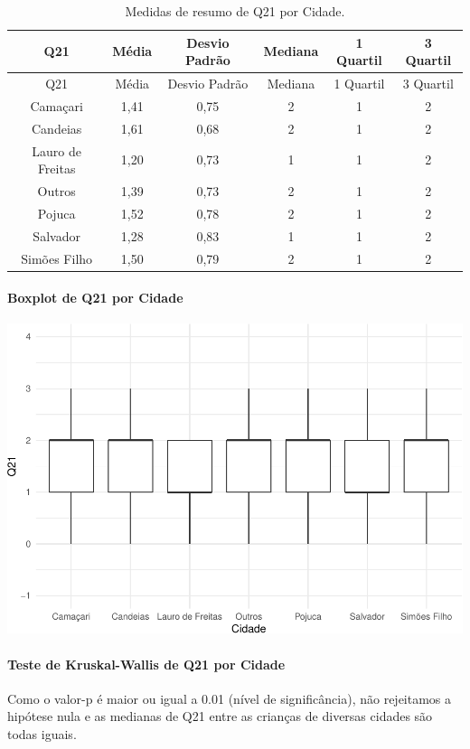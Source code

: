 \documentclass[]{article}
\let\oldparagraph\paragraph
\renewcommand{\paragraph}[1]{\oldparagraph{#1}\mbox{}}
\begin{document}
\begin{longtable}[]{@{}cccccc@{}}
\caption{\label{tab:unnamed-chunk-430}Medidas de resumo de Q21 por Cidade.}\tabularnewline
\toprule
Q21 & Média & Desvio Padrão & Mediana & 1 Quartil & 3 Quartil\tabularnewline
\midrule
\endfirsthead
\toprule
Q21 & Média & Desvio Padrão & Mediana & 1 Quartil & 3 Quartil\tabularnewline
\midrule
\endhead
Camaçari & 1,41 & 0,75 & 2 & 1 & 2\tabularnewline
Candeias & 1,61 & 0,68 & 2 & 1 & 2\tabularnewline
Lauro de Freitas & 1,20 & 0,73 & 1 & 1 & 2\tabularnewline
Outros & 1,39 & 0,73 & 2 & 1 & 2\tabularnewline
Pojuca & 1,52 & 0,78 & 2 & 1 & 2\tabularnewline
Salvador & 1,28 & 0,83 & 1 & 1 & 2\tabularnewline
Simões Filho & 1,50 & 0,79 & 2 & 1 & 2\tabularnewline
\bottomrule
\end{longtable}

\hypertarget{boxplot-de-q21-por-cidade}{%
\paragraph{Boxplot de Q21 por Cidade}\label{boxplot-de-q21-por-cidade}}

\begin{center}\includegraphics[width=0.75\linewidth]{relatorio_covid19_files/figure-latex/unnamed-chunk-431-1} \end{center}

\hypertarget{teste-de-kruskal-wallis-de-q21-por-cidade}{%
\paragraph{Teste de Kruskal-Wallis de Q21 por Cidade}\label{teste-de-kruskal-wallis-de-q21-por-cidade}}

Como o valor-p é maior ou igual a 0.01 (nível de significância), não rejeitamos a hipótese nula e as medianas de Q21 entre as crianças de diversas cidades são todas iguais.
\end{document}
